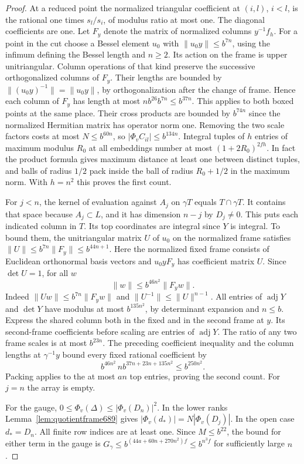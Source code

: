 \documentclass[a4paper,11pt]{article}
\theoremstyle{definition}
\theoremstyle{remark}
\numberwithin{equation}{section}
\begin{document}
\begin{proof}
At a reduced point the normalized triangular coefficient at
\((i,l)\), \(i<l\), is the rational one times \(s_l/s_i\),
of modulus ratio at most one. The diagonal coefficients are
one. Let \(F_y\) denote the matrix of normalized columns
\(y^{-1}f_h\). For a point in the cut choose a Bessel element
\(u_0\) with \(\|u_0y\|\le b^{7n}\), using the infimum defining
the Bessel length and \(n\ge2\). Its action on the frame is
upper unitriangular. Column operations of that kind preserve
the successive orthogonalized columns of \(F_y\). Their
lengths are bounded by \(\|(u_0y)^{-1}\|=\|u_0y\|\), by
orthogonalization after the change of frame. Hence each
column of \(F_y\) has length at most
\(n b^{26}b^{7n}\le b^{37n}\). This applies to both boxed
points at the same place. Their cross products are bounded
by \(b^{74n}\) since the normalized Hermitian matrix has
operator norm one. Removing the two scale factors costs at
most \(N\le b^{60n}\), so \(|\Phi_v C_{il}|\le b^{134n}\).
Integral tuples of \(h\) entries of maximum modulus \(R_0\)
at all embeddings number at most \((1+2R_0)^{2fh}\).
In fact the product formula gives maximum distance at least
one between distinct tuples, and balls of radius \(1/2\)
pack inside the ball of radius \(R_0+1/2\) in the maximum
norm. With \(h=n^2\) this proves the first count.

For \(j<n\), the kernel of evaluation against \(A_j\) on
\(\gamma T\) equals \(T\cap\gamma T\). It contains that space
because \(A_j\subset L\), and it has dimension \(n-j\) by
\(D_j\ne0\). This puts each indicated column in \(T\). Its
top coordinates are integral since \(Y\) is integral. To
bound them, the unitriangular matrix \(U\) of \(u_0\) on the
normalized frame satisfies
\(\|U\|\le b^{7n}\|F_y\|\le b^{44n+1}\). Here the normalized
fixed frame consists of Euclidean orthonormal basis vectors
and \(u_0y F_y\) has coefficient matrix \(U\). Since
\(\det U=1\), for all \(w\)
\[
                    \|w\|\le b^{46n^2}\|F_y w\|.
\]
Indeed \(\|Uw\|\le b^{7n}\|F_yw\|\) and
\(\|U^{-1}\|\le\|U\|^{n-1}\).
All entries of \(\operatorname{adj}Y\) and \(\det Y\) have
modulus at most \(b^{135n^2}\), by determinant expansion and
\(n\le b\). Express the shared column both in the fixed and
in the second frame at \(y\). Its second-frame coefficients
before scaling are entries of \(\operatorname{adj}Y\).
The ratio of any two frame scales is at most \(b^{23n}\).
The preceding coefficient inequality and the column lengths
at \(\gamma^{-1}y\) bound every fixed rational coefficient by
\[
              b^{46n^2}\, n b^{37n+23n+135n^2}
                    \le b^{250n^2}.
\]
Packing applies to the at most \(an\) top entries, proving
the second count. For \(j=n\) the array is empty.

For the gauge, \(0\le\Phi_v(\Delta)\le|\Phi_v(D_n)|^2\).
In the lower ranks Lemma~\ref{lem:quotientframe689} gives
\(|\Phi_v(d_*)|=N|\Phi_v(D_j)|\). In the open case \(d_*=D_n\).
All finite row indices are at least one. Since \(M\le b^{22}\),
the bound for either term in the gauge is
\(G_\gamma\le b^{(44a+60n+270n^2)f}\le b^{n^3f}\) for
sufficiently large \(n\).
\end{proof}
\end{document}
